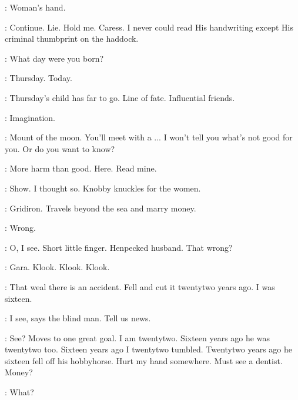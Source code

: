 \Zoe:
Woman's hand.

\Stephen:
Continue.
Lie.
Hold me. Caress.
I never could read His handwriting except His criminal thumbprint on the haddock.

\Zoe:
What day were you born?

\Stephen:
Thursday.
Today.

\Zoe:
Thursday's child has far to go.
Line of fate.
Influential friends.

\Florry:
Imagination.

\Zoe:
Mount of the moon.
You'll meet with a ...
I won't tell you what's not good for you.
Or do you want to know?

\Bloom:
More harm than good.
Here.
Read mine.

\Bella:
Show.
I thought so.
Knobby knuckles for the women.

\Zoe:
Gridiron.
Travels beyond the sea and marry money.

\Bloom:
Wrong.

\Zoe:
O, I see.
Short little finger.
Henpecked husband.
That wrong?


\BlackLiz:
Gara.
Klook.
Klook.
Klook.

\Bloom:
That weal there is an accident.
Fell and cut it twentytwo years ago.
I was sixteen.

\Zoe:
I see, says the blind man.
Tell us news.

\Stephen:
See?
Moves to one great goal.
I am twentytwo.
Sixteen years ago he was twentytwo too.
Sixteen years ago I twentytwo tumbled.
Twentytwo years ago he sixteen fell off his hobbyhorse.
Hurt my hand somewhere.
Must see a dentist.
Money?


\Florry:
What?


